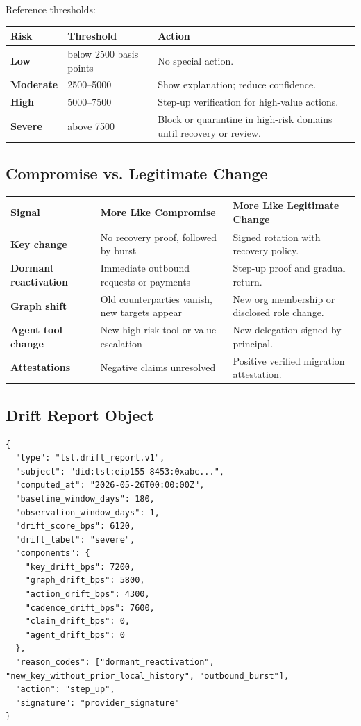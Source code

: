 \documentclass[11pt]{article}
\begin{document}
Reference thresholds:

\begin{center}
\begin{tabularx}{\textwidth}{>{\bfseries}p{} p{} X}
\toprule
Risk & Threshold & Action \\
\midrule
Low & below 2500 basis points & No special action. \\
Moderate & 2500--5000 & Show explanation; reduce confidence. \\
High & 5000--7500 & Step-up verification for high-value actions. \\
Severe & above 7500 & Block or quarantine in high-risk domains until recovery or review. \\
\bottomrule
\end{tabularx}
\end{center}

\subsection{Compromise vs. Legitimate Change}

\begin{center}
\begin{tabularx}{\textwidth}{>{\bfseries}p{} p{} X}
\toprule
Signal & More Like Compromise & More Like Legitimate Change \\
\midrule
Key change & No recovery proof, followed by burst & Signed rotation with recovery policy. \\
Dormant reactivation & Immediate outbound requests or payments & Step-up proof and gradual return. \\
Graph shift & Old counterparties vanish, new targets appear & New org membership or disclosed role change. \\
Agent tool change & New high-risk tool or value escalation & New delegation signed by principal. \\
Attestations & Negative claims unresolved & Positive verified migration attestation. \\
\bottomrule
\end{tabularx}
\end{center}

\subsection{Drift Report Object}

\begin{lstlisting}[style=tslcode]
{
  "type": "tsl.drift_report.v1",
  "subject": "did:tsl:eip155-8453:0xabc...",
  "computed_at": "2026-05-26T00:00:00Z",
  "baseline_window_days": 180,
  "observation_window_days": 1,
  "drift_score_bps": 6120,
  "drift_label": "severe",
  "components": {
    "key_drift_bps": 7200,
    "graph_drift_bps": 5800,
    "action_drift_bps": 4300,
    "cadence_drift_bps": 7600,
    "claim_drift_bps": 0,
    "agent_drift_bps": 0
  },
  "reason_codes": ["dormant_reactivation", "new_key_without_prior_local_history", "outbound_burst"],
  "action": "step_up",
  "signature": "provider_signature"
}
\end{lstlisting}
\end{document}
